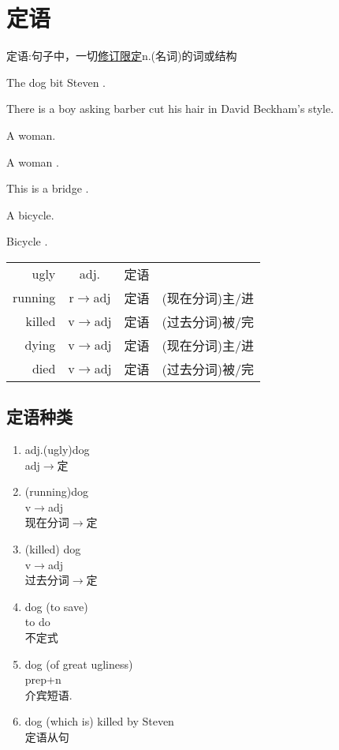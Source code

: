 \section{定语}
\begin{definition}
	定语:句子中，一切\uline{修订限定}n.(名词)的词或结构
\end{definition}
\begin{example}
	The  dog bit  Steven .
\end{example}
\begin{example}
	There is a boy asking barber cut his hair in David Beckham's style.
\end{example}
\begin{example}
	A  woman.
\end{example}
\begin{example}
		A woman .
\end{example}
\begin{example}
	This is a bridge .
\end{example}
\begin{example}
	A  bicycle.
\end{example}
\begin{example}
	Bicycle .
\end{example}
\begin{tabular}{rcll}
	ugly&adj.&定语&\\
	running&r$\rightarrow$adj&定语&(现在分词)主/进\\
	killed&v$\rightarrow$adj&定语&(过去分词)被/完\\
	dying&v$\rightarrow$adj&定语&(现在分词)主/进\\
	died&v$\rightarrow$adj&定语&(过去分词)被/完
\end{tabular}
\subsection{定语种类}
\begin{enumerate}
	\item adj.(ugly)dog\\adj$\rightarrow$定
	\item (running)dog\\v$\rightarrow$adj\\现在分词$\rightarrow$定
	\item (killed) dog\\v$\rightarrow$adj\\过去分词$\rightarrow$定
	\item dog (to save)\\to do\\不定式
	\item dog (of great ugliness)\\prep+n\\介宾短语.
	\item dog (which is) killed by Steven\\定语从句
\end{enumerate}